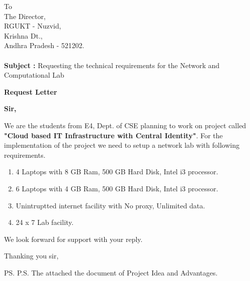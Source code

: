 \documentclass{letter}
\begin{document}

\begin{letter}{To \\ The Director, \\ RGUKT - Nuzvid, \\ Krishna Dt., \\ Andhra Pradesh - 521202. \\  \textbf{ \\ Subject : }  Requesting the technical requirements for the Network and Computational Lab \\} %



\begin{center}
\Large
\textbf{Request Letter}
\end{center}

\normalsize



\opening{\textbf{Sir,}}
 
\hspace{1cm} We are the students from E4, Dept. of CSE planning to work on project called \textbf{"Cloud based IT Infrastructure with Central Identity"}. For the implementation of the project we need to setup a network lab with following requirements.

\begin{enumerate}

	\item 4 Laptops with 8 GB Ram, 500 GB Hard Disk, Intel i3 processor.
	\item 6 Laptops with 4 GB Ram, 500 GB Hard Disk, Intel i3 processor.
	\item Unintruptted internet facility with No proxy, Unlimited data.
	\item 24 x 7 Lab facility.
	
\end{enumerate}	

	We look forward for support with your reply.

\vspace{1\parskip} %
\closing{ Thanking you sir,}
\vspace{7\parskip} %

\ps{P.S. The attached the document of Project Idea and Advantages.} %



\end{letter}
 
\end{document}
